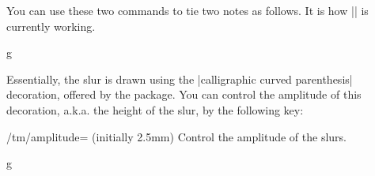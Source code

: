 You can use these two commands to tie two notes as follows. It is how |\tmtie| is
currently working.
\begin{codeexample}[]
\begin{tmline}
\begin{tmstaff}{g}{}
\end{tmstaff}
\end{tmline}
\end{codeexample}
Essentially, the slur is drawn using the |calligraphic curved parenthesis| 
decoration, offered by the  package. You can control the amplitude of 
this decoration, a.k.a. the height of the slur, by the following key:
\begin{key}{/tm/amplitude= (initially 2.5mm)}
  Control the amplitude of the slurs.
\end{key}
\begin{codeexample}[]
\begin{tmline}
\begin{tmstaff}{g}{}
\end{tmstaff}
\end{tmline}
\end{codeexample}
